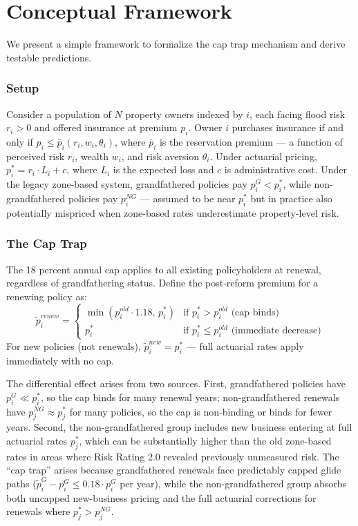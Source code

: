 \documentclass[12pt]{article}
\begin{document}
\section{Conceptual Framework}
\label{sec:framework}

We present a simple framework to formalize the cap trap mechanism and derive testable predictions.

\subsubsection*{Setup} Consider a population of $N$ property owners indexed by $i$, each facing flood risk $r_i > 0$ and offered insurance at premium $p_i$. Owner $i$ purchases insurance if and only if $p_i \leq \bar{p}_i(r_i, w_i, \theta_i)$, where $\bar{p}_i$ is the reservation premium --- a function of perceived risk $r_i$, wealth $w_i$, and risk aversion $\theta_i$. Under actuarial pricing, $p_i^* = r_i \cdot L_i + c$, where $L_i$ is the expected loss and $c$ is administrative cost. Under the legacy zone-based system, grandfathered policies pay $p_i^G < p_i^*$, while non-grandfathered policies pay $p_i^{NG}$ --- assumed to be near $p_i^*$ but in practice also potentially mispriced when zone-based rates underestimate property-level risk.

\subsubsection*{The Cap Trap} The 18 percent annual cap applies to all existing policyholders at renewal, regardless of grandfathering status. Define the post-reform premium for a renewing policy as:
\begin{equation}
\label{eq:cap_trap}
\tilde{p}_i^{renew} = \begin{cases} \min(p_i^{old} \cdot 1.18, \, p_i^*) & \text{if } p_i^* > p_i^{old} \text{ (cap binds)} \\ p_i^* & \text{if } p_i^* \leq p_i^{old} \text{ (immediate decrease)} \end{cases}
\end{equation}
For new policies (not renewals), $\tilde{p}_i^{new} = p_i^*$ --- full actuarial rates apply immediately with no cap.

The differential effect arises from two sources. First, grandfathered policies have $p_i^G \ll p_i^*$, so the cap binds for many renewal years; non-grandfathered renewals have $p_j^{NG} \approx p_j^*$ for many policies, so the cap is non-binding or binds for fewer years. Second, the non-grandfathered group includes new business entering at full actuarial rates $p_j^*$, which can be substantially higher than the old zone-based rates in areas where Risk Rating 2.0 revealed previously unmeasured risk. The ``cap trap'' arises because grandfathered renewals face predictably capped glide paths ($\tilde{p}_i^G - p_i^G \leq 0.18 \cdot p_i^G$ per year), while the non-grandfathered group absorbs both uncapped new-business pricing and the full actuarial corrections for renewals where $p_j^* > p_j^{NG}$.
\end{document}
